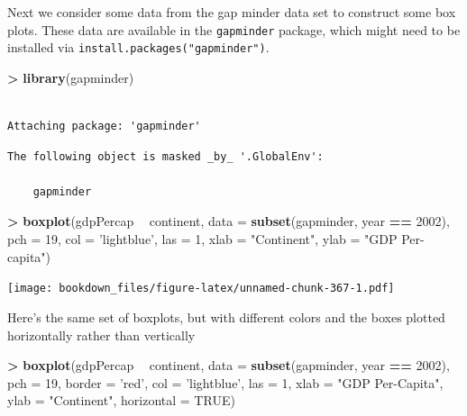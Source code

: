 \documentclass[]{krantz}
\makeatletter
\newenvironment{Shaded}{\begin{snugshade}}{\end{snugshade}}
\newcommand{\KeywordTok}[1]{\textcolor[rgb]{0.27,0.27,0.27}{\textbf{#1}}}
\newcommand{\DataTypeTok}[1]{\textcolor[rgb]{0.27,0.27,0.27}{#1}}
\newcommand{\DecValTok}[1]{\textcolor[rgb]{0.06,0.06,0.06}{#1}}
\newcommand{\StringTok}[1]{\textcolor[rgb]{0.5,0.5,0.5}{#1}}
\newcommand{\OtherTok}[1]{\textcolor[rgb]{0.37,0.37,0.37}{#1}}
\newcommand{\OperatorTok}[1]{\textcolor[rgb]{0.43,0.43,0.43}{\textbf{#1}}}
\newcommand{\NormalTok}[1]{#1}
\newenvironment{kframe}{%
\medskip{}
\setlength{\fboxsep}{.8em}
 \def\at@end@of@kframe{}%
 \ifinner\ifhmode%
  \def\at@end@of@kframe{\end{minipage}}%
  \begin{minipage}{\columnwidth}%
 \fi\fi%
 \def\FrameCommand##1{\hskip\@totalleftmargin \hskip-\fboxsep
 \colorbox{shadecolor}{##1}\hskip-\fboxsep
     \hskip-\linewidth \hskip-\@totalleftmargin \hskip\columnwidth}%
 \MakeFramed {\advance\hsize-\width
   \@totalleftmargin\z@ \linewidth\hsize
   \@setminipage}}%
 {\par\unskip\endMakeFramed%
 \at@end@of@kframe}
\renewenvironment{Shaded}{\begin{kframe}}{\end{kframe}}
\makeatother
\begin{document}
Next we consider some data from the gap minder data set to construct
some box plots. These data are available in the \texttt{gapminder}
package, which might need to be installed via
\texttt{install.packages("gapminder")}.

\begin{Shaded}
\begin{Highlighting}[]
\OperatorTok{>}\StringTok{ }\KeywordTok{library}\NormalTok{(gapminder)}
\end{Highlighting}
\end{Shaded}

\begin{verbatim}

Attaching package: 'gapminder'
\end{verbatim}

\begin{verbatim}
The following object is masked _by_ '.GlobalEnv':

    gapminder
\end{verbatim}

\begin{Shaded}
\begin{Highlighting}[]
\OperatorTok{>}\StringTok{ }\KeywordTok{boxplot}\NormalTok{(gdpPercap }\OperatorTok{~}\StringTok{ }\NormalTok{continent, }\DataTypeTok{data =} \KeywordTok{subset}\NormalTok{(gapminder, year }\OperatorTok{==}\StringTok{ }\DecValTok{2002}\NormalTok{), }\DataTypeTok{pch =} \DecValTok{19}\NormalTok{, }\DataTypeTok{col =} \StringTok{'lightblue'}\NormalTok{, }\DataTypeTok{las =} \DecValTok{1}\NormalTok{, }\DataTypeTok{xlab =} \StringTok{"Continent"}\NormalTok{, }\DataTypeTok{ylab =} \StringTok{"GDP Per-capita"}\NormalTok{)}
\end{Highlighting}
\end{Shaded}

\texttt{[image: bookdown\_files/figure-latex/unnamed-chunk-367-1.pdf]}

Here's the same set of boxplots, but with different colors and the boxes
plotted horizontally rather than vertically

\begin{Shaded}
\begin{Highlighting}[]
\OperatorTok{>}\StringTok{ }\KeywordTok{boxplot}\NormalTok{(gdpPercap }\OperatorTok{~}\StringTok{ }\NormalTok{continent, }\DataTypeTok{data =} \KeywordTok{subset}\NormalTok{(gapminder, year }\OperatorTok{==}\StringTok{ }\DecValTok{2002}\NormalTok{), }\DataTypeTok{pch =} \DecValTok{19}\NormalTok{, }\DataTypeTok{border =} \StringTok{'red'}\NormalTok{, }\DataTypeTok{col =} \StringTok{'lightblue'}\NormalTok{, }\DataTypeTok{las =} \DecValTok{1}\NormalTok{, }\DataTypeTok{xlab =} \StringTok{"GDP Per-Capita"}\NormalTok{, }\DataTypeTok{ylab =} \StringTok{"Continent"}\NormalTok{, }\DataTypeTok{horizontal =} \OtherTok{TRUE}\NormalTok{)}
\end{Highlighting}
\end{Shaded}
\end{document}
